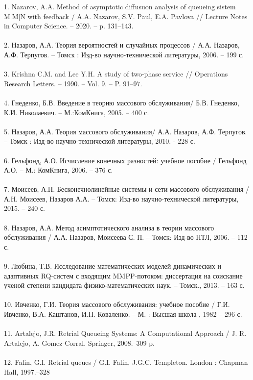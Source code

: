1. Nazarov, A.A. Method of asymptotic diffusuon analysis of queueing sistem M|M|N with feedback / A.A. Nazarov, S.V. Paul, E.A. Pavlova // Lecture Notes in Computer Science. -- 2020. -- p. 131--143.\\
\\
2. Назаров, А.А. Теория вероятностей и случайных процессов / А.А. Назаров,
А.Ф. Терпугов. -- Томск : Изд-во научно-технической литературы, 2006. --
199 с. \\
\\
3. Krishna C.M. and Lee Y.H. A study of two-phase service //
Operations Research Letters. – 1990. – Vol. 9. – P. 91–97.\\
\\
4. Гнеденко, Б.В.  Введение в теорию массового обслуживания/ Б.В. Гнеденко, К.И. Николаевич. – М.:КомКнига, 2005. – 400 с.\\
\\
5. Назаров, А.А. Теория массового обслуживания/ А.А. Назаров,
А.Ф. Терпугов. – Томск : Изд-во научно-технической литературы, 2010. -
228 с. \\
\\
6. Гельфонд, А.О. Исчисление конечных разностей: учебное пособие / Гельфонд А.О. – М.: КомКнига, 2006. – 376 с.\\
\\
7. Моисеев, А.Н. Бесконечнолинейные системы и сети массового обслуживания / А.Н. Моисеев, Назаров А.А. – Томск: Изд-во научно-технической литературы, 2015. – 240 с.\\
\\
8.  Назаров, А.А. Метод асимптотического анализа в теории массового обслуживания / А.А. Назаров, Моисеева С. П. – Томск: Изд-во НТЛ, 2006. – 112 с.\\
\\
9. Любина, Т.В. Исследование математических моделей динамических и адаптивных RQ-систем с входящим MMPP-потоком: диссертация на соискание ученой степени кандидата физико-математических наук. – Томск., 2013. – 163 с.\\
\\
10. Ивченко, Г.И. Теория массового обслуживания: учебное пособие / Г.И. Ивченко, В.А. Каштанов, И.Н. Коваленко. – 	
М. : Высшая школа , 1982 – 296 с.\\
\\
11. Artalejo, J.R. Retrial Queueing Systems: A Computational Approach / J. R. Artalejo, A. Gomez-Corral.
Springer, 2008.–309 p.\\
\\
12. Falin, G.I. Retrial queues / G.I. Falin, J.G.C. Templeton. London : Chapman Hall, 1997.–328 \\
